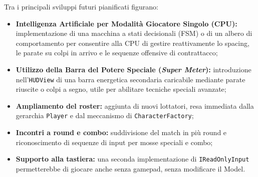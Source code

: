 \documentclass[11pt, a4paper]{article}
\begin{document}
	Tra i principali sviluppi futuri pianificati figurano:
	\begin{itemize}
		\item \textbf{Intelligenza Artificiale per Modalità Giocatore Singolo (CPU):} implementazione di una macchina a stati decisionali (FSM) o di un albero di comportamento per consentire alla CPU di gestire reattivamente lo spacing, le parate su colpi in arrivo e le sequenze offensive di contrattacco;
		\item \textbf{Utilizzo della Barra del Potere Speciale (\emph{Super Meter}):} introduzione nell'\texttt{HUDView} di una barra energetica secondaria caricabile mediante parate riuscite o colpi a segno, utile per abilitare tecniche speciali avanzate;
		\item \textbf{Ampliamento del roster:} aggiunta di nuovi lottatori, resa immediata dalla gerarchia \texttt{Player} e dal meccanismo di \texttt{CharacterFactory};
		\item \textbf{Incontri a round e combo:} suddivisione del match in più round e riconoscimento di sequenze di input per mosse speciali e combo;
		\item \textbf{Supporto alla tastiera:} una seconda implementazione di \texttt{IReadOnlyInput} permetterebbe di giocare anche senza gamepad, senza modificare il Model.
	\end{itemize}
	
	\newpage
	
\end{document}
